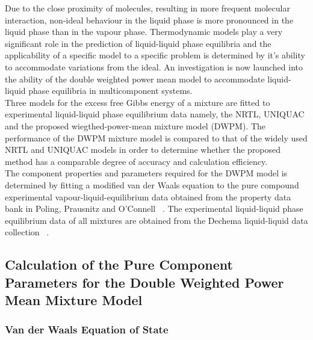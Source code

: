 Due to the close proximity of molecules, resulting in more frequent molecular interaction, non-ideal behaviour in the liquid phase is more pronounced in the liquid phase than in the vapour phase. Thermodynamic models play a very significant role in the prediction of liquid-liquid phase equilibria and the applicability of a specific model to a specific problem is determined by it's ability to accommodate variations from the ideal. An investigation is now launched into the ability of the double weighted power mean model to accommodate liquid-liquid phase equilibria in multicomponent systems.\\

Three models for the excess free Gibbs energy of a mixture are fitted to experimental liquid-liquid phase equilibrium data namely, the NRTL, UNIQUAC and the proposed wiegthed-power-mean mixture model (DWPM). The performance of the DWPM mixture model is compared to that of the widely used NRTL and UNIQUAC models in order to determine whether the proposed method has a comparable degree of accuracy and calculation efficiency.\\
	
The component properties and parameters required for the DWPM model is determined by fitting a modified van der Waals equation to the pure 	compound experimental vapour-liquid-equilibrium data obtained from the property data bank in Poling, Prausnitz and O'Connell ~\cite{GasLiquidProperties}. The experimental liquid-liquid phase equilibrium data of all mixtures are obtained from the Dechema liquid-liquid data collection ~\cite{Dechema}.\\
	

\subsection{Calculation of the Pure Component Parameters for the Double Weighted Power Mean Mixture Model}
	\subsubsection{Van der Waals Equation of State}
			
